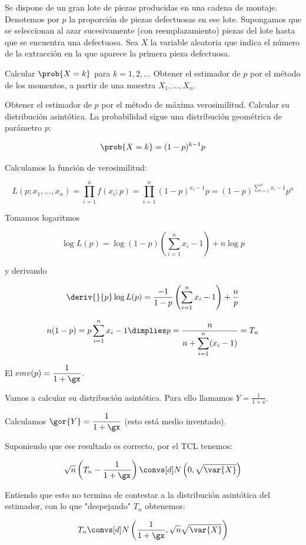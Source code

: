 \begin{problem}[3] Se dispone de un gran lote de piezas producidas en una cadena de montaje. Denotemos por $p$ la proporción de piezas defectuosas en ese lote. Supongamos que se seleccionan al azar sucesivamente (con reemplazamiento) piezas del lote hasta que se encuentra una defectuosa. Sea $X$ la variable aleatoria que indica el número de la extracción en la que aparece la primera pieza defectuosa.

\ppart Calcular $\prob{X=k}$ para $k=1,2,\dotsc$ Obtener el estimador de $p$ por el método de los momentos, a partir de una muestra $X_1,\dotsc , X_n$.

\ppart Obtener el estimador de $p$ por el método de máxima verosimilitud. Calcular su distribución asintótica.
\solution
\spart
La probabilidad sigue una distribución geométrica de parámetro $p$:

\[ \prob{X=k} = (1-p)^{k-1}p \]

\spart Calculamos la función de verosimilitud:

\[ L(p;x_1,\dotsc,x_n) = \prod_{i=1}^n f(x_i;p) = \prod_{i=1}^n (1-p)^{x_i - 1}p = (1-p)^{\sum_{i=1}^n x_i - 1} p^n \]

Tomamos logaritmos

\[ \log L(p) = \log(1-p) \left(\sum_{i=1}^n x_i - 1\right) + n\log p \]

y derivando

\[ \deriv{}{p} \log L(p) = \frac{-1}{1-p} \left(\sum_{i=1}^n x_i - 1\right)  + \frac{n}{p} \] 

\[n(1-p) = p \sum_{i=1}^n x_i - 1 \dimplies p = \frac{n}{n + \displaystyle \sum_{i=1}^n (x_i-1)} = T_n\]

El $emv(p) = \displaystyle\frac{1}{1 + \gx}$.

Vamos a calcular su distribución asintótica. Para ello llamamos $Y = \displaystyle \frac{1}{1+x}$.

Calculamos $\gor{Y} = \displaystyle\frac{1}{1+\gx}$ (esto está medio inventado).

Suponiendo que ese resultado es correcto, por el TCL tenemos:

\[\sqrt{n} \left(T_n - \frac{1}{1+\gx}\right) \convs[d] N\left(0,\sqrt{\var{X}}\right)\]

Entiendo que esto no termina de contestar a la distribución asintótica del estimador, con lo que "despejando" $T_n$ obtenemos:

\[T_n \convs[d] N\left(\frac{1}{1+\gx} , \sqrt{n}\sqrt{ \var{X}}\right)\]

\end{problem}

